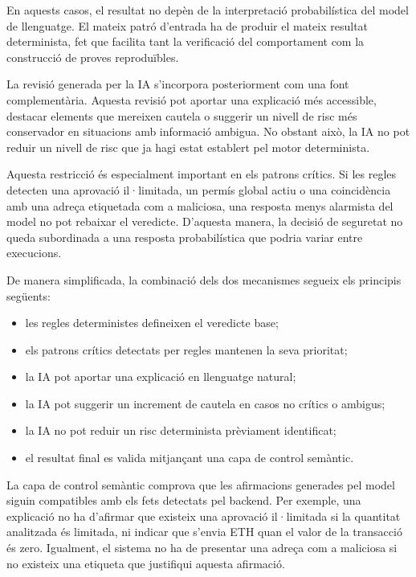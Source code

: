 En aquests casos, el resultat no depèn de la interpretació probabilística del model de llenguatge. El mateix patró d’entrada ha de produir el mateix resultat determinista, fet que facilita tant la verificació del comportament com la construcció de proves reproduïbles.

La revisió generada per la IA s’incorpora posteriorment com una font complementària. Aquesta revisió pot aportar una explicació més accessible, destacar elements que mereixen cautela o suggerir un nivell de risc més conservador en situacions amb informació ambigua. No obstant això, la IA no pot reduir un nivell de risc que ja hagi estat establert pel motor determinista.

Aquesta restricció és especialment important en els patrons crítics. Si les regles detecten una aprovació il·limitada, un permís global actiu o una coincidència amb una adreça etiquetada com a maliciosa, una resposta menys alarmista del model no pot rebaixar el veredicte. D’aquesta manera, la decisió de seguretat no queda subordinada a una resposta probabilística que podria variar entre execucions.

De manera simplificada, la combinació dels dos mecanismes segueix els principis següents:

\begin{itemize}
    \item les regles deterministes defineixen el veredicte base;
    
    \item els patrons crítics detectats per regles mantenen la seva prioritat;
    
    \item la IA pot aportar una explicació en llenguatge natural;
    
    \item la IA pot suggerir un increment de cautela en casos no crítics o ambigus;
    
    \item la IA no pot reduir un risc determinista prèviament identificat;
    
    \item el resultat final es valida mitjançant una capa de control semàntic.
\end{itemize}

La capa de control semàntic comprova que les afirmacions generades pel model siguin compatibles amb els fets detectats pel backend. Per exemple, una explicació no ha d’afirmar que existeix una aprovació il·limitada si la quantitat analitzada és limitada, ni indicar que s’envia ETH quan el valor de la transacció és zero. Igualment, el sistema no ha de presentar una adreça com a maliciosa si no existeix una etiqueta que justifiqui aquesta afirmació.

